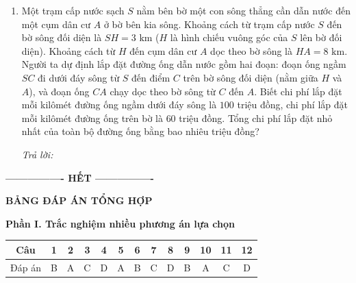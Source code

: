 \documentclass[12pt,a4paper]{article}
\newcommand{\otraloi}{\par\nobreak\smallskip\noindent\textit{Trả lời:}\quad\fbox{\rule{0pt}{11pt}\makebox[0.3cm]{}}\,\fbox{\rule{0pt}{11pt}\makebox[0.3cm]{}}\,\fbox{\rule{0pt}{11pt}\makebox[0.3cm]{}}\,\fbox{\rule{0pt}{11pt}\makebox[0.3cm]{}}}
\begin{document}
\begin{enumerate}[start=3]
\item Một trạm cấp nước sạch $S$ nằm bên bờ một con sông thẳng cần dẫn nước đến một cụm dân cư $A$ ở bờ bên kia sông. Khoảng cách từ trạm cấp nước $S$ đến bờ sông đối diện là $SH=3\text{ km}$ ($H$ là hình chiếu vuông góc của $S$ lên bờ đối diện). Khoảng cách từ $H$ đến cụm dân cư $A$ dọc theo bờ sông là $HA=8\text{ km}$. Người ta dự định lắp đặt đường ống dẫn nước gồm hai đoạn: đoạn ống ngầm $SC$ đi dưới đáy sông từ $S$ đến điểm $C$ trên bờ sông đối diện (nằm giữa $H$ và $A$), và đoạn ống $CA$ chạy dọc theo bờ sông từ $C$ đến $A$. Biết chi phí lắp đặt mỗi kilômét đường ống ngầm dưới đáy sông là $100$ triệu đồng, chi phí lắp đặt mỗi kilômét đường ống trên bờ là $60$ triệu đồng. Tổng chi phí lắp đặt nhỏ nhất của toàn bộ đường ống bằng bao nhiêu triệu đồng?
\begin{center}
\par{}
\end{center}
\otraloi
\end{enumerate}
\begin{center}\textbf{---------------- HẾT ----------------}\end{center}

\newpage\pagestyle{answers}
\begin{center}\Large\textbf{BẢNG ĐÁP ÁN TỔNG HỢP}\end{center}
\textbf{Phần I. Trắc nghiệm nhiều phương án lựa chọn}
\begin{center}
\renewcommand{\arraystretch}{1.5}
\begin{tabular}{|c|*{12}{c|}}\hline
Câu & 1&2&3&4&5&6&7&8&9&10&11&12\\\hline
Đáp án & B & A & C & D & A & B & C & D & B & A & C & D \\\hline
\end{tabular}
\end{center}
\end{document}
